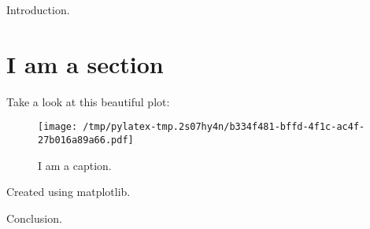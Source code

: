 \documentclass{article}%
\begin{document}
%
\normalsize%
Introduction.%
\section{I am a section}%
\label{sec:Iamasection}%
Take a look at this beautiful plot:%


\begin{figure}[htbp]%
\centering%
\texttt{[image: /tmp/pylatex-tmp.2s07hy4n/b334f481-bffd-4f1c-ac4f-27b016a89a66.pdf]}%
\caption{I am a caption.}%
\end{figure}

%
Created using matplotlib.

%
Conclusion.%
\end{document}
